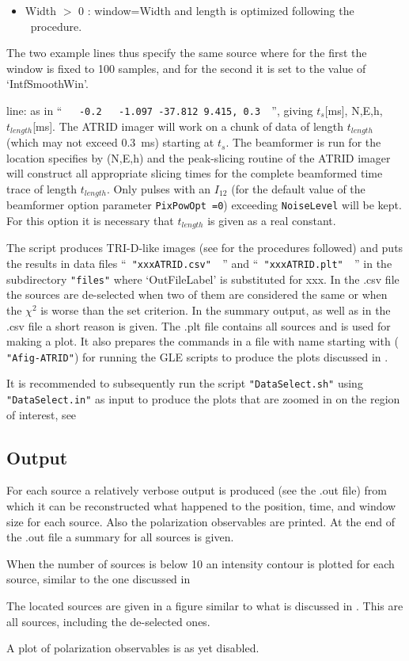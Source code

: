 \begin{enumerate*}
\begin{itemize}
      \item Width $>$ 0 : window=Width and length is optimized following the \ATRID\ procedure.
   \end{itemize}
   The two example lines thus specify the same source where for the first the window is fixed to 100 samples, and for the second it is set to the value of `IntfSmoothWin'.
\item[line:] as in ``\verb#   -0.2   -1.097 -37.812 9.415, 0.3  #'', giving $t_s$[ms], N,E,h, $t_{length}$[ms]. The ATRID imager will work on a chunk of data of length $t_{length}$ (which may not exceed 0.3~ms) starting at $t_s$. The beamformer is run for the location specifies by (N,E,h) and the peak-slicing routine of the ATRID imager will construct all appropriate slicing times for the complete beamformed time trace of length $t_{length}$. Only pulses with an $I_{12}$ (for the default value of the beamformer option parameter \verb!PixPowOpt =0!) exceeding \verb!NoiseLevel! will be kept. For this option it is necessary that $t_{length}$ is given as a real constant.
\end{enumerate*}


The script produces TRI-D-like images (see  for the procedures followed)
and puts the results in data files ``\verb# "xxxATRID.csv"  #'' and ``\verb# "xxxATRID.plt"  #'' in the subdirectory \verb!"files"! where `OutFileLabel' is substituted for xxx. In the .csv file the sources are de-selected when two of them are considered the same or when the $\chi^2$ is worse than the set criterion. In the summary output, as well as in the .csv file a short reason is given. The .plt file contains all sources and is used for making a plot.  It also prepares the commands in a file with name starting with ( \verb!"Afig-ATRID"!) for running the GLE scripts \cite{GLE} to produce the plots discussed in .

It is recommended to subsequently run the script \verb!"DataSelect.sh"! using \verb!"DataSelect.in"! as input to produce the plots that are zoomed in on the region of interest, see 

\subsection{Output}

For each source a relatively verbose output is produced (see the .out file) from which it can be reconstructed what happened to the position, time, and window size for each source. Also the polarization observables are printed. At the end of the .out file a summary for all sources is given.

When the number of sources is below 10 an intensity contour is plotted for each source, similar to the one discussed in 

The located sources are given in a figure similar to what is discussed in . This are all sources, including the de-selected ones.

A plot of polarization observables is as yet disabled.

